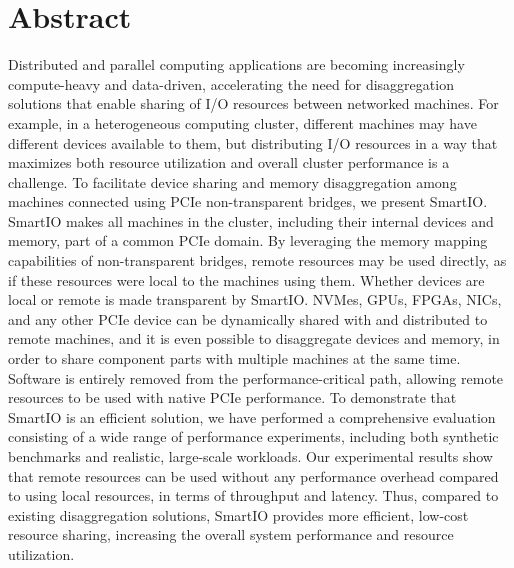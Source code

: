 \chapter{Abstract}
Distributed and parallel computing applications are becoming increasingly compute-heavy and data-driven, accelerating the need for disaggregation solutions that enable sharing of I/O resources between networked machines.
%
For example, in a heterogeneous computing cluster, different machines may have different devices available to them, but distributing I/O resources in a way that maximizes both resource utilization and overall cluster performance is a challenge.
%
To facilitate device sharing and memory disaggregation among machines connected using PCIe non-transparent bridges, we present SmartIO.
%
SmartIO makes all machines in the cluster, including their internal devices and memory, part of a common PCIe domain.
%
By leveraging the memory mapping capabilities of non-transparent bridges, remote resources may be used directly, as if these resources were local to the machines using them.
%
Whether devices are local or remote is made transparent by SmartIO.
%
NVMes, GPUs, FPGAs, NICs, and any other PCIe device can be dynamically shared with and distributed to remote machines, and it is even possible to disaggregate devices and memory, in order to share component parts with multiple machines at the same time.
%
Software is entirely removed from the performance-critical path, allowing remote resources to be used with native PCIe performance. 
%
To demonstrate that SmartIO is an efficient solution, we have performed a comprehensive evaluation consisting of a wide range of performance experiments, including both synthetic benchmarks and realistic, large-scale workloads.
%
Our experimental results show that remote resources can be used without any performance overhead compared to using local resources, in terms of throughput and latency.
%
Thus, compared to existing disaggregation solutions, SmartIO provides more efficient, low-cost resource sharing, increasing the overall system performance and resource utilization.

